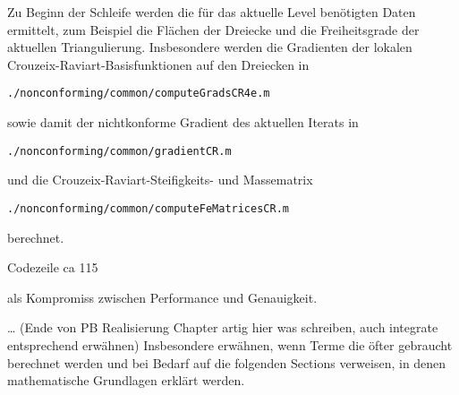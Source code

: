 Zu Beginn der Schleife werden die für das aktuelle Level benötigten Daten
ermittelt, zum Beispiel die Flächen der Dreiecke und die Freiheitsgrade der
aktuellen Triangulierung. 
Insbesondere werden die Gradienten der lokalen
Crouzeix-Raviart-Basisfunktionen auf den Dreiecken in
\begin{center}
  \texttt{./nonconforming/common/computeGradsCR4e.m}
\end{center}
sowie damit der nichtkonforme Gradient des aktuellen Iterats in
\begin{center}
  \texttt{./nonconforming/common/gradientCR.m}
\end{center}
und die Crouzeix-Raviart-Steifigkeits- und Massematrix 
\begin{center}
  \texttt{./nonconforming/common/computeFeMatricesCR.m}
\end{center}
berechnet. 

Codezeile ca 115


als Kompromiss zwischen Performance und Genauigkeit.


\ldots
(Ende von PB Realisierung Chapter artig hier was schreiben, auch integrate
entsprechend erwähnen)
Insbesondere erwähnen, wenn Terme die öfter gebraucht berechnet werden und
bei Bedarf auf die folgenden Sections verweisen, in denen mathematische
Grundlagen erklärt werden.

